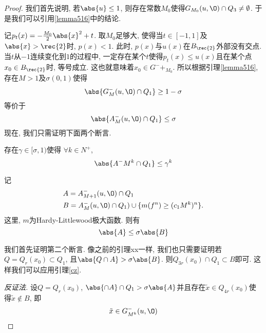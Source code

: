 \begin{proof}
    我们首先说明, 若$\abs{u} \le 1$, 则存在常数$M_0$使得$G_{M_0}(u, \O)\cap Q_3 \ne \emptyset$.  于是我们可以引用\eqref{lemma516}中的结论.  
    \par 记$p_t(x)=-\frac{M_0}{2}\abs{x}^2+t$.  取$M_0$足够大, 使得当$t \in [-1, 1]$及$\abs{x}>\rec{2}$时, $p(x) <1$.  此时, $p(x)$与$u(x)$在$B_\rec{2}$外部没有交点.  当$t$从$-1$连续变化到$1$的过程中, 一定存在某个$t$使得$p_t(x) \le u(x)$且在某个点$x_0 \in B_\rec{2}$时, 等号成立.  这也就意味着$x_0\in  G^-+_{M_0}$.  所以根据引理\eqref{lemma516}, 存在$M>1$及$\sigma (0, 1)$使得
    \begin{equation*}
        \abs{G^-_M(u, \O) \cap Q_1} \ge 1-\sigma
    \end{equation*}
    等价于
    \begin{equation*}
        \abs{A^-_M(u, \O) \cap Q_1} \le \sigma
    \end{equation*}
    现在, 我们只需证明下面两个断言.  
    \begin{claim} \label{c1}
        存在$\gamma\in [\sigma, 1)$使得 $\forall k \in N^+$, 
        \begin{equation*}
            \abs{A^-{M^k} \cap Q_1} \le \gamma^k
        \end{equation*}
    \end{claim}
    \begin{claim} \label{c2}
    记
    \begin{equation*}
        \begin{split}
            &A=A^-_{M+1}(u, \O)\cap Q_1 \\
            &B=A^-_{M}(u, \O)\cap Q_1) \cup \{m(f^n) \ge (c_1M^k)^n\}.  
        \end{split}
    \end{equation*}
    这里, $m$为Hardy-Littlewood极大函数.  则有
    \begin{equation*}
        \abs{A} \le \sigma \abs{B}
    \end{equation*}
    \end{claim}
    我们首先证明第二个断言.  像之前的引理xx一样, 我们也只需要证明若$Q=Q_r(x_0)\subset Q_1$, 且$\abs{Q \cap A} > \sigma \abs{B}$.  则$Q_{3r}(x_0) \cap Q_1 \subset B$即可.  这样我们可以应用引理\eqref{cz}.  
    \par \textit{反证法.  }设$Q=Q_r(x_0)$, $\abs{\cap A} \cap Q_1> \sigma\abs{A}$并且存在$\tilde{x} \in Q_{4r}(x_0)$使得$\tilde{x} \notin B$, 即
    \begin{equation}
        \tilde{x} \in G^-_{M^k}(u, \O)
    \end{equation}

\end{proof}
